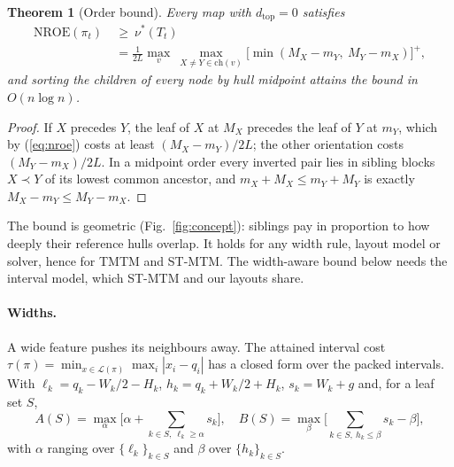 \documentclass[review]{vgtc}                 %
\newtheorem{theorem}{Theorem}
\newcommand{\dtop}{d_{\mathrm{top}}}
\newcommand{\nroe}{\mathrm{NROE}}
\begin{document}
\begin{theorem}[Order bound]\label{thm:order}
Every map with $\dtop=0$ satisfies
\begin{equation}\label{eq:nu}
\begin{aligned}
\nroe(\pi_t)\ &\ge\ \nu^*(T_t)\\
&=\frac{1}{2L}\max_{v}\ \max_{X\ne Y\in\mathrm{ch}(v)}\big[\min(M_X-m_Y,\ M_Y-m_X)\big]^+ ,
\end{aligned}
\end{equation}
and sorting the children of every node by hull midpoint attains the bound in $O(n\log n)$.
\end{theorem}
\begin{proof}
If $X$ precedes $Y$, the leaf of $X$ at $M_X$ precedes the leaf of $Y$ at $m_Y$, which by (\ref{eq:nroe}) costs at least $(M_X-m_Y)/2L$; the other orientation costs $(M_Y-m_X)/2L$. In a midpoint order every inverted pair lies in sibling blocks $X\prec Y$ of its lowest common ancestor, and $m_X+M_X\le m_Y+M_Y$ is exactly $M_X-m_Y\le M_Y-m_X$.
\end{proof}

The bound is geometric (Fig.~\ref{fig:concept}): siblings pay in proportion to how deeply their reference hulls overlap. It holds for any width rule, layout model or solver, hence for TMTM and ST-MTM. The width-aware bound below needs the interval model, which ST-MTM and our layouts share.

\paragraph{Widths.} A wide feature pushes its neighbours away. The attained interval cost $\tau(\pi)=\min_{x\in\mathcal{L}(\pi)}\max_i|x_i-q_i|$ has a closed form over the packed intervals. With $\ell_k=q_k-W_k/2-H_k$, $h_k=q_k+W_k/2+H_k$, $s_k=W_k+g$ and, for a leaf set $S$,
\begin{equation}
A(S)=\max_{\alpha}\Big[\alpha+\!\!\sum_{k\in S,\ \ell_k\ge\alpha}\!\! s_k\Big],\quad
B(S)=\max_{\beta}\Big[\sum_{k\in S,\ h_k\le\beta}\!\! s_k-\beta\Big],
\end{equation}
with $\alpha$ ranging over $\{\ell_k\}_{k\in S}$ and $\beta$ over $\{h_k\}_{k\in S}$.
\end{document}
